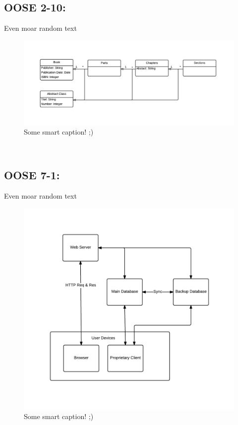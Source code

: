 \documentclass[11pt,a4paper]{article}
\begin{document}
\subsection{OOSE 2-10:}
Even moar random text \\
\begin{figure}[h!]
    \centering
    \includegraphics[width=1.1\textwidth]{pictures/oose2_10}
    \caption{Some smart caption! ;)}
    \label{fig:OOSE210}
\end{figure}
\\

\subsection{OOSE 7-1:}
Even moar random text \\
\begin{figure}[h!]
    \centering
    \includegraphics[width=1.1\textwidth]{pictures/oose7_1}
    \caption{Some smart caption! ;)}
    \label{fig:OOSE71}
\end{figure}
\\\\
\end{document}
